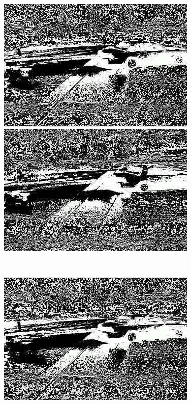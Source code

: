 \documentclass[a4paper]{ctexart}
\begin{document}
\begin{enumerate}[label=\arabic*、]
\begin{figure}[htbp]
\begin{minipage}[t]{0.2\textwidth}
		\end{minipage}
		\begin{minipage}[t]{0.2\textwidth}
			\centering
			\includegraphics[width=\textwidth]{figure/frames/avg39410.jpg}
		\end{minipage}
		\begin{minipage}[t]{0.2\textwidth}
			\centering
			\includegraphics[width=\textwidth]{figure/frames/avg39415.jpg}
		\end{minipage}\\
		\begin{minipage}[t]{0.2\textwidth}
			\centering
			\includegraphics[width=\textwidth]{figure/frames/avg49400.jpg}

\end{minipage}
\end{figure}
\end{enumerate}
\end{document}
